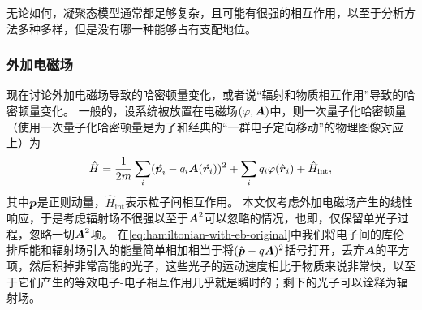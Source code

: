 \documentclass[hyperref, UTF8, a4paper]{ctexart}
\begin{document}
无论如何，凝聚态模型通常都足够复杂，且可能有很强的相互作用，以至于分析方法多种多样，但是没有哪一种能够占有支配地位。

\subsubsection{外加电磁场}

现在讨论外加电磁场导致的哈密顿量变化，或者说“辐射和物质相互作用”导致的哈密顿量变化。
一般的，设系统被放置在电磁场$(\varphi, \vb*{A})$中，则一次量子化哈密顿量（使用一次量子化哈密顿量是为了和经典的“一群电子定向移动”的物理图像对应上）为
\begin{equation}
    \hat{H} = \frac{1}{2m} \sum_i (\hat{\vb*{p}_i} - q_i \vb*{A}(\hat{\vb*{r}_i}))^2 + \sum_i q_i \varphi(\hat{\vb*{r}}_i) + \hat{H}_\text{int},
    \label{eq:hamiltonian-with-eb-original}
\end{equation}
其中$\vb*{p}$是正则动量，$\hat{H}_\text{int}$表示粒子间相互作用。
本文仅考虑外加电磁场产生的线性响应，于是考虑辐射场不很强以至于$\vb*{A}^2$可以忽略的情况，也即，仅保留单光子过程，忽略一切$\vb*{A}^2$项。
在\eqref{eq:hamiltonian-with-eb-original}中我们将电子间的库伦排斥能和辐射场引入的能量简单相加相当于将$(\hat{\vb*{p}} - q \vb*{A})^2$括号打开，丢弃$\vb*{A}$的平方项，然后积掉非常高能的光子，这些光子的运动速度相比于物质来说非常快，以至于它们产生的等效电子-电子相互作用几乎就是瞬时的；剩下的光子可以诠释为辐射场。
\end{document}
